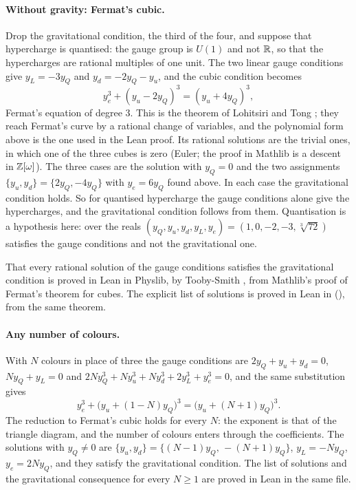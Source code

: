 \documentclass[11pt]{article}
\begin{document}
\paragraph{Without gravity: Fermat's cubic.}
Drop the gravitational condition, the third of the four, and suppose that hypercharge is quantised: the gauge group is $U(1)$ and not $\mathbb{R}$, so that the hypercharges are rational multiples of one unit.
The two linear gauge conditions give $y_L = -3y_Q$ and $y_d = -2y_Q-y_u$, and the cubic condition becomes
\[
  y_e^3+(y_u-2y_Q)^3 = (y_u+4y_Q)^3,
\]
Fermat's equation of degree 3.
This is the theorem of Lohitsiri and Tong \cite{LohitsiriTong}; they reach Fermat's curve by a rational change of variables, and the polynomial form above is the one used in the Lean proof.
Its rational solutions are the trivial ones, in which one of the three cubes is zero (Euler; the proof in Mathlib is a descent in $\mathbb{Z}[\omega]$).
The three cases are the solution with $y_Q=0$ and the two assignments $\{y_u,y_d\} = \{2y_Q,-4y_Q\}$ with $y_e = 6y_Q$ found above.
In each case the gravitational condition holds.
So for quantised hypercharge the gauge conditions alone give the hypercharges, and the gravitational condition follows from them.
Quantisation is a hypothesis here: over the reals $(y_Q,y_u,y_d,y_L,y_e) = (1,0,-2,-3,\sqrt[3]{72})$ satisfies the gauge conditions and not the gravitational one.

That every rational solution of the gauge conditions satisfies the gravitational condition is proved in Lean in Physlib, by Tooby-Smith \cite{Physlib,HepLean}, from Mathlib's proof of Fermat's theorem for cubes.
The explicit list of solutions is proved in Lean in \formal{} (), from the same theorem.

\paragraph{Any number of colours.}
With $N$ colours in place of three the gauge conditions are $2y_Q+y_u+y_d=0$, $Ny_Q+y_L=0$ and $2Ny_Q^3+Ny_u^3+Ny_d^3+2y_L^3+y_e^3=0$, and the same substitution gives
\[
  y_e^3+\bigl(y_u+(1-N)y_Q\bigr)^3 = \bigl(y_u+(N+1)y_Q\bigr)^3 .
\]
The reduction to Fermat's cubic holds for every $N$: the exponent is that of the triangle diagram, and the number of colours enters through the coefficients.
The solutions with $y_Q\neq0$ are $\{y_u,y_d\} = \{(N-1)y_Q,\,-(N+1)y_Q\}$, $y_L=-Ny_Q$, $y_e=2Ny_Q$, and they satisfy the gravitational condition.
The list of solutions and the gravitational consequence for every $N\ge1$ are proved in Lean in the same file.
\end{document}
